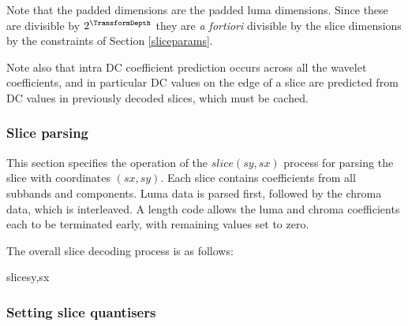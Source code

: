 Note that the padded dimensions are the padded luma dimensions. Since these are divisible 
by $2^\TransformDepth$ they are {\em a fortiori} divisible by the slice dimensions by 
the constraints of Section \ref{sliceparams}. 

Note also that intra DC coefficient prediction
occurs across all the wavelet coefficients, and in particular DC values on the edge of a slice
are predicted from DC values in previously decoded slices, which must be cached. 

\subsubsection{Slice parsing}
\label{sliceparsing}

This section specifies the operation of the $slice(sy,sx)$ process for parsing the slice with coordinates $(sx,sy)$. Each slice
contains coefficients from all subbands and components. Luma data is parsed first, followed by the chroma data, which
is interleaved. A length code allows the luma and chroma coefficients each to be terminated early, with remaining values
set to zero.

The overall slice decoding process is as follows:

\begin{pseudo}{slice}{sy,sx}
  \bsEND
\bsEND
{}
  \bsEND
\bsEND
{}
\end{pseudo}

\subsubsection{Setting slice quantisers}
\label{slicequantisers}

